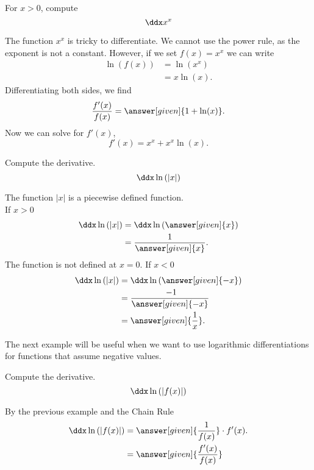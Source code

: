 \documentclass{ximera}
\begin{document}
\begin{example}

For  $x>0$, compute 
\[
\ddx x^x
\]

\begin{explanation}

The function $x^x$ is tricky to differentiate. We cannot use the power
rule, as the exponent is not a constant. However, if we set $f(x) = x^x$ we can write
\begin{align*}
\ln(f(x)) &= \ln\left(x^x\right)\\
&=x\ln(x).
\end{align*}
Differentiating both sides, we find
\[
\frac{f'(x)}{f(x)} = \answer[given]{1 + \ln(x)}.
\]
Now we can solve for $f'(x)$, 
\[
f'(x) = x^x + x^x\ln(x).
\]
\end{explanation}
\end{example}


\begin{example}
\author{Nela Lakos}
Compute the derivative.
\[
\ddx\ln{(|x|)}
\]
\begin{explanation}

The function $|x|$ is a piecewise defined function. \\

If $x>0$
\begin{align*}
\ddx\ln{(|x|)} &= \ddx\ln{(\answer[given]{x})}\\
&=\dfrac{1}{\answer[given]{x}}.
\end{align*}
The function is not defined at $x=0$. If $x<0$
\begin{align*}
\ddx\ln{(|x|)} &= \ddx\ln{(\answer[given]{-x})}\\
&=\dfrac{\ -1}{\answer[given]{-x}}\\
&=\answer[given]{\dfrac{1}{x}}.
\end{align*}
\end{explanation}
\end{example}

The next  example will be useful when we want to use logarithmic differentiations for functions that  assume negative values. 


\begin{example}
\author{Nela Lakos}
Compute the derivative.
\[
\ddx\ln{(|f(x)|)}
\]
\begin{explanation}
By the previous example and the Chain Rule
\begin{align*}
\ddx\ln{(|f(x)|)} &=\answer[given]{\dfrac{1}{f(x)}}\cdot f'(x).\\
&=\answer[given]{\dfrac{f'(x)}{f(x)}}
\end{align*}
\end{explanation}
\end{example}
\end{document}
